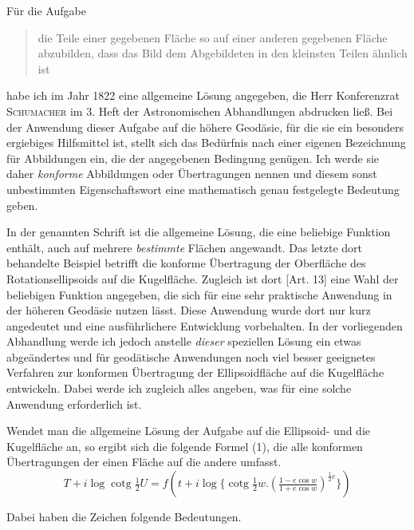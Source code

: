 \indent Für die Aufgabe
\begin{quote}
die Teile einer gegebenen Fläche so auf einer anderen gegebenen Fläche abzubilden, dass das Bild dem Abgebildeten in den kleinsten Teilen ähnlich ist
\end{quote}
\noindent habe ich im Jahr 1822 eine allgemeine Lösung angegeben, die Herr Konferenzrat \textsc{Schumacher} im 3. Heft der Astronomischen Abhandlungen abdrucken ließ. Bei der Anwendung dieser Aufgabe auf die höhere Geodäsie, für die sie ein besonders ergiebiges Hilfsmittel ist, stellt sich das Bedürfnis nach einer eigenen Bezeichnung für Abbildungen ein, die der angegebenen Bedingung genügen. Ich werde sie daher \textit{konforme} Abbildungen oder Übertragungen nennen und diesem sonst unbestimmten Eigenschaftswort eine mathematisch genau festgelegte Bedeutung geben.

In der genannten Schrift ist die allgemeine Lösung, die eine beliebige Funktion enthält, auch auf mehrere \textit{bestimmte} Flächen angewandt. Das letzte dort behandelte Beispiel betrifft die konforme Übertragung der Oberfläche des Rotationsellipsoids auf die Kugelfläche. Zugleich ist dort [Art. 13] eine Wahl der beliebigen Funktion angegeben, die sich für eine sehr praktische Anwendung in der höheren Geodäsie nutzen lässt. Diese Anwendung wurde dort nur kurz angedeutet und eine ausführlichere Entwicklung vorbehalten. In der vorliegenden Abhandlung werde ich jedoch anstelle \textit{dieser} speziellen Lösung ein etwas abgeändertes und für geodätische Anwendungen noch viel besser geeignetes Verfahren zur konformen Übertragung der Ellipsoidfläche auf die Kugelfläche entwickeln. Dabei werde ich zugleich alles angeben, was für eine solche Anwendung erforderlich ist.

\indent Wendet man die allgemeine Lösung der Aufgabe auf die Ellipsoid- und die Kugelfläche an, so ergibt sich die folgende Formel (1), die alle konformen Übertragungen der einen Fläche auf die andere umfasst.
\[
T+i\log\operatorname{cotg}\tfrac{1}{2}U=f(t+i\log\{\operatorname{cotg}\tfrac{1}{2}w\mathord{.}(\tfrac{1-e\cos w}{1+e\cos w})^{\frac{1}{2}e}\})
\]

Dabei haben die Zeichen folgende Bedeutungen.
